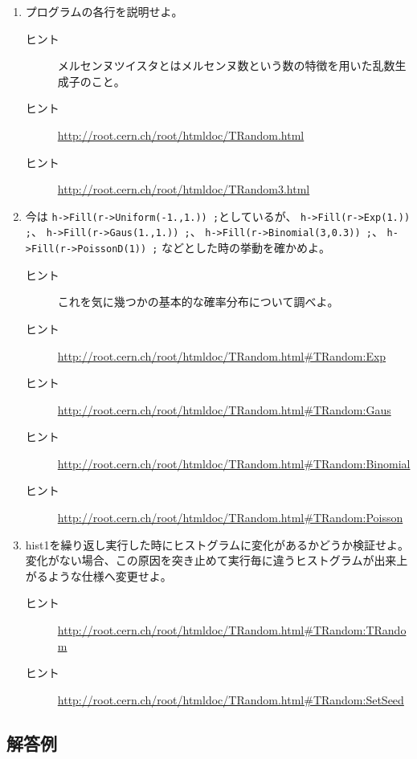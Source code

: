 \documentclass{jarticle}
\begin{document}
  \begin{enumerate}

   \item プログラムの各行を説明せよ。
	 \begin{description}
	  \item[ヒント] メルセンヌツイスタとはメルセンヌ数という数の特徴を用いた乱数生成子のこと。
	  \item[ヒント] \url{http://root.cern.ch/root/htmldoc/TRandom.html}
	  \item[ヒント] \url{http://root.cern.ch/root/htmldoc/TRandom3.html}
	 \end{description}

   \item 今は
	 \verb|h->Fill(r->Uniform(-1.,1.)) ;|としているが、
	 \verb|h->Fill(r->Exp(1.)) ;|、
	 \verb|h->Fill(r->Gaus(1.,1.)) ;|、
	 \verb|h->Fill(r->Binomial(3,0.3)) ;|、
	 \verb|h->Fill(r->PoissonD(1)) ;|
	 などとした時の挙動を確かめよ。
	 \begin{description}
	  \item[ヒント] これを気に幾つかの基本的な確率分布について調べよ。
	  \item[ヒント] \url{http://root.cern.ch/root/htmldoc/TRandom.html#TRandom:Exp}
	  \item[ヒント] \url{http://root.cern.ch/root/htmldoc/TRandom.html#TRandom:Gaus}
	  \item[ヒント] \url{http://root.cern.ch/root/htmldoc/TRandom.html#TRandom:Binomial}
	  \item[ヒント] \url{http://root.cern.ch/root/htmldoc/TRandom.html#TRandom:Poisson}
	 \end{description}

   \item hist1を繰り返し実行した時にヒストグラムに変化があるかどうか検証せよ。
	 変化がない場合、この原因を突き止めて実行毎に違うヒストグラムが出来上がるような仕様へ変更せよ。
	 \begin{description} 
	  \item[ヒント] \url{http://root.cern.ch/root/htmldoc/TRandom.html#TRandom:TRandom}
	  \item[ヒント] \url{http://root.cern.ch/root/htmldoc/TRandom.html#TRandom:SetSeed}
	 \end{description}
  \end{enumerate}

  \subsection{解答例}
\end{document}

